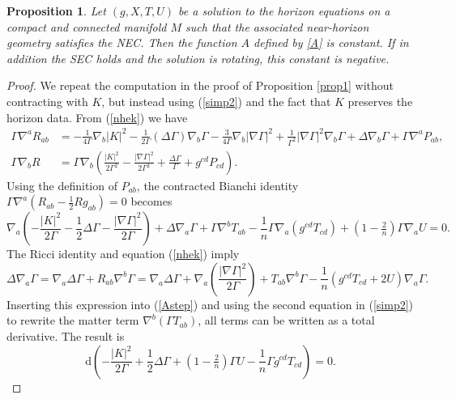 \documentclass[11pt, reqno]{amsart}
\theoremstyle{plain}
\newtheorem{prop}[theorem]{Proposition}
\theoremstyle{definition}
\numberwithin{equation}{section}
\begin{document}
\begin{prop} \label{propA}
    Let $(g,X,T,U)$ be a solution to the horizon equations on a compact and connected manifold $M$ such that the associated near-horizon geometry satisfies the NEC. Then the function $A$ defined by \eqref{A} is constant. If in addition the SEC holds and the solution is rotating, this constant is negative.
\end{prop}
\begin{proof}
We repeat the computation in the proof of Proposition \ref{prop1} without contracting with $K$, but instead using (\ref{simp2}) and the fact that $K$ preserves the horizon data. From (\ref{nhek}) we have 
\begin{align*}
    \Gamma\nabla^aR_{ab} &= -\frac{1}{4\Gamma}\nabla_b \vert K \vert^2 -\frac{1}{2\Gamma}(\Delta \Gamma)\nabla_b\Gamma - \frac{3}{4\Gamma}\nabla_b \vert \nabla \Gamma \vert^2 + \frac{1}{\Gamma^2}\vert \nabla \Gamma \vert^2\nabla_b\Gamma + \Delta \nabla_b\Gamma+ \Gamma \nabla^aP_{ab}, \\[3pt]
    \Gamma\nabla_b R &= \Gamma \nabla_b\left(\frac{\vert K \vert^2}{2\Gamma^2} - \frac{\vert \nabla \Gamma \vert^2}{2\Gamma^2} + \frac{\Delta \Gamma}{\Gamma} + g^{cd}P_{cd}\right).
\end{align*}
Using the definition of $P_{ab}$, the contracted Bianchi identity $\Gamma\nabla^a(R_{ab}-\frac 12R g_{ab}) = 0$ becomes
    \begin{equation} \label{Astep}
        \nabla_a\left(-\frac{\vert K \vert^2}{2\Gamma} - \frac 12\Delta \Gamma -\frac{\vert \nabla \Gamma \vert^2}{2\Gamma}\right) + \Delta \nabla_a \Gamma + \Gamma \nabla^bT_{ab} - \frac 1n\Gamma \nabla_a (g^{cd}T_{cd}) + (1- \tfrac 2n)\Gamma\nabla_a U = 0.
    \end{equation}
    The Ricci identity and equation (\ref{nhek}) imply
    \begin{equation*}
        \Delta \nabla_a \Gamma = \nabla_a \Delta \Gamma + R_{ab}\nabla^b\Gamma = \nabla_a \Delta \Gamma + \nabla_a\left(\frac{\vert \nabla \Gamma \vert^2}{2\Gamma}\right) + T_{ab}\nabla^b\Gamma - \frac 1n(g^{cd}T_{cd} + 2U)\nabla_a \Gamma.
    \end{equation*}
    Inserting this expression into (\ref{Astep}) and using the second equation in (\ref{simp2}) to rewrite the matter term $\nabla^b(\Gamma T_{ab})$, all terms can be written as a total derivative. The result is
    \begin{equation*}
        \text{d}\left(-\frac{\vert K \vert^2}{2\Gamma} + \frac 12 \Delta \Gamma + (1-\tfrac 2n)\Gamma U - \frac 1n\Gamma g^{cd}T_{cd}\right) = 0.

\end{equation*}
\end{proof}
\end{document}
